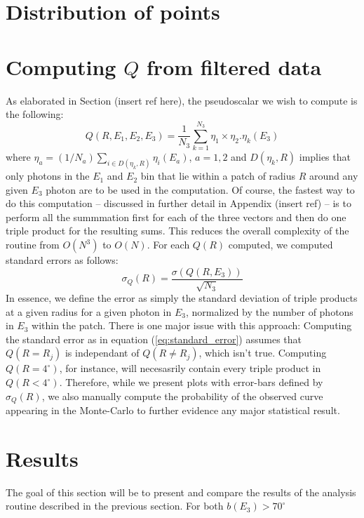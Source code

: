 \section{Distribution of points}

\section{Computing $Q$ from filtered data}
As elaborated in Section (insert ref here), the pseudoscalar we wish to compute is
the following:
\begin{equation}
	Q(R,E_{1},E_{2},E_{3}) = \frac{1}{N_3}\sum_{k=1}^{N_{3}}\eta_1\times\eta_2
	.\eta_k(E_3)
\end{equation}
where $\eta_a = (1/N_a)\sum_{i\in D(\eta_k,R)} \eta_{i}(E_a)$, $a={1,2}$ and 
$D(\eta_k,R)$ implies that only photons in the $E_1$ and $E_2$ bin that lie
within a patch of radius $R$ around any given $E_3$ photon are to be used in
the computation.
Of course, the fastest way to do this computation -- discussed in further detail 
in Appendix (insert ref) -- is to perform all the summmation first for each of 
the three vectors and then do one triple product for the resulting sums.
This reduces the overall complexity of the routine from $O(N^{3})$ to $O(N)$.
For each $Q(R)$ computed, we computed standard errors as follows:
\begin{equation}
	\sigma_Q(R) = \frac{\sigma(Q(R,E_{3}))}{\sqrt{N_3}}
	\label{eq:standard_error}
\end{equation}
In essence, we define the error as simply the standard deviation of triple products
at a given radius for a given photon in $E_{3}$, normalized by the number of photons
in $E_{3}$ within the patch.
There is one major issue with this approach:
Computing the standard error as in equation (\ref{eq:standard_error}) assumes 
that $Q(R=R_{j})$ is independant of $Q(R \neq R_{j})$, which isn't true. 
Computing $Q(R=4^{\circ})$, for instance, will necesasrily contain every 
triple product in $Q(R < 4^{\circ})$.
Therefore, while we present plots with error-bars defined by $\sigma_Q(R)$,
we also manually compute the probability of the observed curve appearing in
the Monte-Carlo to further evidence any major statistical result.

\section{Results}
The goal of this section will be to present and compare the results of the
analysis routine described in the previous section.
For both $b(E_{3}) > 70^{\circ}$

